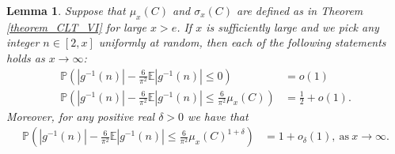 \documentclass[11pt,reqno,a4letter]{article}
\numberwithin{figure}{section}
\numberwithin{table}{section}
\theoremstyle{plain}
\newtheorem{lemma}[theorem]{Lemma}
\numberwithin{theorem}{section}
\theoremstyle{definition}
\begin{document}
\begin{lemma} 
\label{lemma_ProbsOfAbsgInvnDist_v2} 
Suppose that $\mu_x(C)$ and $\sigma_x(C)$ are defined as in 
Theorem \ref{theorem_CLT_VI} for large $x > e$. 
If $x$ is sufficiently large and we pick any integer $n \in [2, x]$ uniformly at random, then 
each of the following statements holds as $x \rightarrow \infty$: 
\begin{align*} 
\tag{A}
\mathbb{P}\left(|g^{-1}(n)| - \frac{6}{\pi^2} \mathbb{E}|g^{-1}(n)| \leq 0\right) & = o(1) \\ 
\tag{B} 
\mathbb{P}\left(|g^{-1}(n)| - \frac{6}{\pi^2} \mathbb{E}|g^{-1}(n)| \leq \frac{6}{\pi^2} \mu_x(C)\right) & = 
     \frac{1}{2} + o(1). 
\end{align*} 
Moreover, for any positive real $\delta > 0$ we have that 
\begin{align*} 
\tag{C} 
\mathbb{P}\left(|g^{-1}(n)| - \frac{6}{\pi^2} \mathbb{E}|g^{-1}(n)| \leq \frac{6}{\pi^2} \mu_x(C)^{1 + \delta}\right) & = 
     1 + o_{\delta}(1), 
     \mathrm{\ as\ } x \rightarrow \infty. 
\end{align*} 
\end{lemma} 
\end{document}
